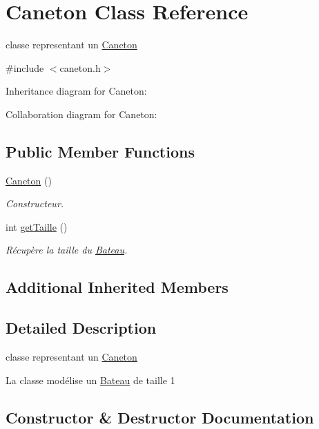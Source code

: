 \hypertarget{class_caneton}{}\section{Caneton Class Reference}
\label{class_caneton}


classe representant un \hyperlink{class_caneton}{Caneton}  




{\ttfamily \#include $<$caneton.\+h$>$}



Inheritance diagram for Caneton\+:


Collaboration diagram for Caneton\+:
\subsection*{Public Member Functions}
\begin{DoxyCompactItemize}
\item 
\hyperlink{class_caneton_a8fecf932fc445c24b89c43342d5a4c36}{Caneton} ()
\begin{DoxyCompactList}\small\item\em Constructeur. \end{DoxyCompactList}\item 
int \hyperlink{class_caneton_a173cbd22638bbf2806a47c329284ceee}{get\+Taille} ()
\begin{DoxyCompactList}\small\item\em Récupère la taille du \hyperlink{class_bateau}{Bateau}. \end{DoxyCompactList}\end{DoxyCompactItemize}
\subsection*{Additional Inherited Members}


\subsection{Detailed Description}
classe representant un \hyperlink{class_caneton}{Caneton} 

La classe modélise un \hyperlink{class_bateau}{Bateau} de taille 1 

\subsection{Constructor \& Destructor Documentation}
